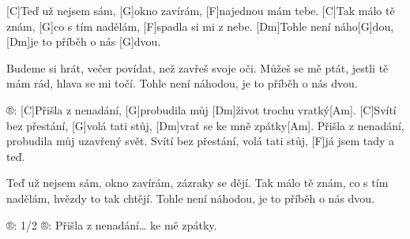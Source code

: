 
[C]Teď už nejsem sám, [G]okno zavírám, [F]najednou mám tebe.
[C]Tak málo tě znám, [G]co s tím nadělám, [F]spadla si mi z nebe.
[Dm]Tohle není náho[G]dou, [Dm]je to příběh o nás [G]dvou.

Budeme si hrát, večer povídat, než zavřeš svoje oči.
Můžeš se mě ptát, jestli tě mám rád, hlava se mi točí.
Tohle není náhodou, je to příběh o nás dvou.

®: [C]Přišla z nenadání, [G]probudila můj [Dm]\null život trochu vratký[Am].
[C]Svítí bez přestání, [G]volá tati stůj, [Dm]vrať se ke mně zpátky[Am].
Přišla z nenadání, probudila můj uzavřený svět.
Svítí bez přestání, volá tati stůj, [F]já jsem tady a teď.

Teď už nejsem sám, okno zavírám, zázraky se dějí.
Tak málo tě znám, co s tím nadělám, hvězdy to tak chtějí.
Tohle není náhodou, je to příběh o nás dvou.

®:
1/2 ®: Přišla z nenadání… ke mě zpátky.